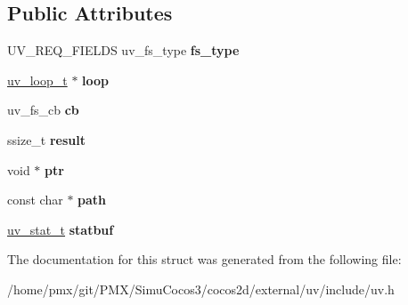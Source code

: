 \subsection*{Public Attributes}
\begin{DoxyCompactItemize}
\item 
\mbox{\label{structuv__fs__s_a616a953d494617f1b75ca144f1fec36d}} 
U\+V\+\_\+\+R\+E\+Q\+\_\+\+F\+I\+E\+L\+DS uv\+\_\+fs\+\_\+type {\bfseries fs\+\_\+type}
\item 
\mbox{\label{structuv__fs__s_abdbac59fe82ef596909a4524fab8b253}} 
\hyperlink{structuv__loop__s}{uv\+\_\+loop\+\_\+t} $\ast$ {\bfseries loop}
\item 
\mbox{\label{structuv__fs__s_ac9b5b65b9e02016db831d2909b2aad8b}} 
uv\+\_\+fs\+\_\+cb {\bfseries cb}
\item 
\mbox{\label{structuv__fs__s_a44e0a0c2e04d9b80f426976dd4961a40}} 
ssize\+\_\+t {\bfseries result}
\item 
\mbox{\label{structuv__fs__s_a3cf0871cfa7fc20b6bb7e1782e1fc3eb}} 
void $\ast$ {\bfseries ptr}
\item 
\mbox{\label{structuv__fs__s_a1cffc1fc9d2a665f00e469f4f3b0d06c}} 
const char $\ast$ {\bfseries path}
\item 
\mbox{\label{structuv__fs__s_a04145df630f32cc064a3a395799c52d2}} 
\hyperlink{structuv__stat__t}{uv\+\_\+stat\+\_\+t} {\bfseries statbuf}
\end{DoxyCompactItemize}


The documentation for this struct was generated from the following file\+:\begin{DoxyCompactItemize}
\item 
/home/pmx/git/\+P\+M\+X/\+Simu\+Cocos3/cocos2d/external/uv/include/uv.\+h\end{DoxyCompactItemize}
